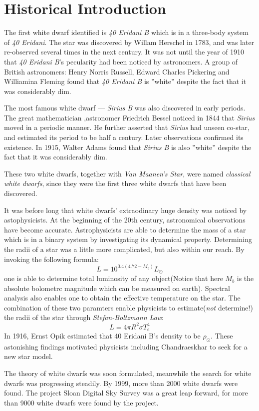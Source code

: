 \documentclass[reprint]{revtex4-1}
\begin{document}
\section{Historical Introduction}
The first white dwarf identified is \emph{40 Eridani B} which is in a three-body system of \emph{40 Eridani}. The star was discovered by Willam Herschel in 1783, and was later re-observed several times in the next century. It was not until the year of 1910 that \emph{40 Eridani B}'s pecularity had been noticed by astronomers. A group of British astronomers: Henry Norris Russell, Edward Charles Pickering and Williamina Fleming found that \emph{40 Eridani B} is ''white'' despite the fact that it was considerably dim. \par
The most famous white dwarf --- \emph{Sirius B} was also discovered in early periods. The great mathematician ,astronomer Friedrich Bessel noticed in 1844 that \emph{Sirius} moved in a periodic manner. He further asserted that \emph{Sirius} had unseen co-star, and estimated its period to be half a century. Later observations confirmed its existence. In 1915, Walter Adams found that \emph{Sirius B} is also ''white'' despite the fact that it was considerably dim.\par
These two white dwarfs, together with \emph{Van Maanen's Star}, were named \emph{classical white dwarfs}, since they were the first three white dwarfs that have been discovered.\par
It was before long that white dwarfs' extraodinary huge density was noticed by astophysicists. At the beginning of the 20th century, astronomical observations have become accurate. Astrophysicists are able to determine the mass of a star which is in a binary system by investigating its dynamical property. Determining the radii of a star was a little more complicated, but also within our reach. By invoking the following formula:\\
\begin{equation}
L=10^{0.4(4.72-M_b)}L_{\odot}
\end{equation}
one is able to determine total luminosity of any object(Notice that here $M_b$ is the absolute bolometrc magnitude which can be measured on earth). Spectral analysis also enables one to obtain the effective temperature on the star. The combination of these two paramters enable physicists to estimate(\emph{not} determine!) the radii of the star through \emph{Stefan-Boltzmann Law}:
\begin{equation}
L=4\pi R^{2}\sigma T_e^{4}
\end{equation}
In 1916, Ernst Opik estimated that 40 Eridani B's density to be $\rho_{\odot}$. These astonishing findings motivated physicists including Chandraeskhar to seek for a new star model.\par
The theory of white dwarfs was soon formulated, meanwhile the search for white dwarfs was progressing steadily. By 1999, more than 2000 white dwarfs were found. The project Sloan Digital Sky Survey was a great leap forward, for more than 9000 white dwarfs were found by the project.
\end{document}
